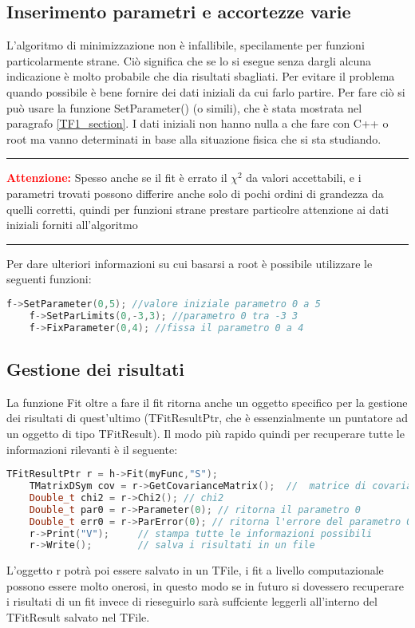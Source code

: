 \subsection{Inserimento parametri e accortezze varie}
L'algoritmo di minimizzazione non è infallibile, specilamente per funzioni particolarmente strane. Ciò significa che se lo si esegue senza dargli alcuna indicazione è molto probabile che dia risultati sbagliati. Per evitare il problema quando possibile è bene fornire dei dati iniziali da cui farlo partire. Per fare ciò si può usare la funzione SetParameter() (o simili), che è stata mostrata nel paragrafo \ref{TF1_section}. I dati iniziali non hanno nulla a che fare con C++ o root ma vanno determinati in base alla situazione fisica che si sta studiando.
{\color{red} \rule{\linewidth}{0.5mm}}
\textcolor{red}{\textbf{Attenzione:}} Spesso anche se il fit è errato il $\chi^2$ da valori accettabili, e i parametri trovati possono differire anche solo di pochi ordini di grandezza da quelli corretti, quindi per funzioni strane prestare particolre attenzione ai dati iniziali forniti all'algoritmo   \\ 
{\color{red} \rule{\linewidth}{0.5mm}}
Per dare ulteriori informazioni su cui basarsi a root è possibile utilizzare le seguenti funzioni:
\begin{lstlisting}[language=C++,label={cod1},mathescape=true,breaklines=true]
	f->SetParameter(0,5); //valore iniziale parametro 0 a 5
	f->SetParLimits(0,-3,3); //parametro 0 tra -3 3
	f->FixParameter(0,4); //fissa il parametro 0 a 4
\end{lstlisting}

\subsection{Gestione dei risultati}
La funzione Fit oltre a fare il fit ritorna anche un oggetto specifico per la gestione dei risultati di quest'ultimo (TFitResultPtr, che è essenzialmente un puntatore ad un oggetto di tipo TFitResult). Il modo più rapido quindi per recuperare tutte le informazioni rilevanti è il seguente:
\begin{lstlisting}[language=C++,label={cod1},mathescape=true,breaklines=true]
	TFitResultPtr r = h->Fit(myFunc,"S");
	TMatrixDSym cov = r->GetCovarianceMatrix();  //  matrice di covarianza
	Double_t chi2 = r->Chi2(); // chi2
	Double_t par0 = r->Parameter(0); // ritorna il parametro 0
	Double_t err0 = r->ParError(0); // ritorna l'errore del parametro 0
	r->Print("V");     // stampa tutte le informazioni possibili
	r->Write();        // salva i risultati in un file
\end{lstlisting}
L'oggetto r potrà poi essere salvato in un TFile, i fit a livello computazionale possono essere molto onerosi, in questo modo se in futuro si dovessero recuperare i risultati di un fit invece di rieseguirlo sarà suffciente leggerli all'interno del TFitResult salvato nel TFile.
